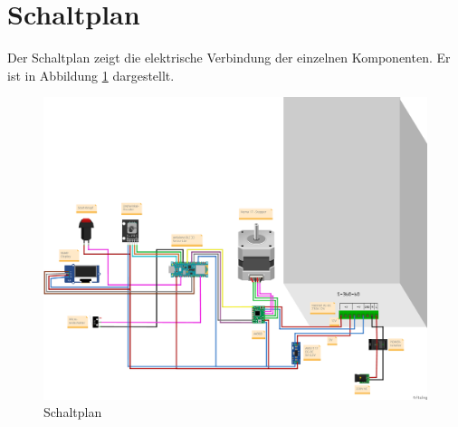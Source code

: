 \section{Schaltplan}
Der Schaltplan zeigt die elektrische Verbindung der einzelnen Komponenten. Er ist in Abbildung \ref{Splan} dargestellt.

\begin{figure}[H]
	\begin{center}
		\includegraphics[width=\textwidth]{Images/Schaltplan1.png}
		\caption{Schaltplan} \label{Splan}
	\end{center}
\end{figure}

 